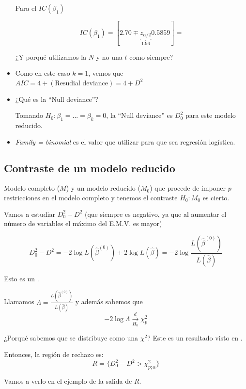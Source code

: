 \begin{example}
\begin{itemize}
  \subitem  Para el $IC(β_1)$

  \[
    IC(β_1) = [2.70 \mp \underbrace{z_{α/2}}_{1.96}0.5859] = 
  \]

  ¿Y porqué utilizamos la $N$ y no una $t$ como siempre? 


  \item Como en este caso $k=1$, vemos que $AIC = 4 + (\text{Resudial deviance}) = 4+D^2$
  \item ¿Qué es la ``Null deviance''? 

    \begin{defn}
    Tomando $H_0 : β_1 = ... = β_k = 0$, la ``Null deviance'' es $D_0^2$ para este modelo reducido.
    \end{defn}

  \item \textit{Family = binomial} es el valor que utilizar para que sea regresión logística.

\end{itemize}

\end{example}

\subsection{Contraste de un modelo reducido}

Modelo completo ($M$) y un modelo reducido ($M_0$) que procede de imponer $p$ restricciones en el modelo completo y tenemos el contraste $H_0 : M_0$ es cierto.

Vamos a estudiar $D_0^2 - D^2$ (que siempre es negativo, ya que al aumentar el número de variables el máximo del E.M.V. es mayor)

\[
D_0^2 - D^2  = -2 \log L(\hat{β}^{(0)}) + 2 \log L(\hat{β}) = -2\log\frac{L(\hat{β}^{(0)})}{L(\hat{β})}\] 

Esto es un . 

Llamamos $\Lambda = \frac{L(\hat{β}^{(0)})}{L(\hat{β})}$ y además sabemos que $$-2\log\Lambda\xrightarrow[H_0]{d}\chi^2_p$$


¿Porqué sabemos que se distribuye como una $\chi^2$? Este es un resultado visto en \cite[IV.4.3]{ApuntesEstI}.

Entonces, la región de rechazo es: \[R = \{D^2_0 - D^2 > \chi^2_{p;α}\}\]


Vamos a verlo en el ejemplo de la salida de $R$.

